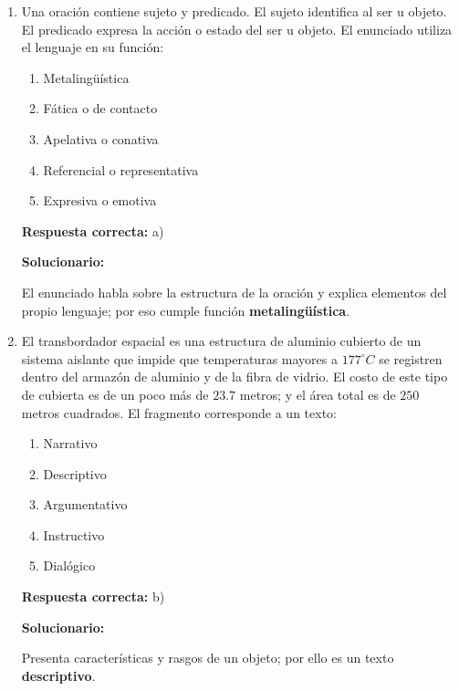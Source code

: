 \begin{enumerate}[resume]
	
	\item Una oración contiene sujeto y predicado. El sujeto identifica al ser u objeto. El predicado expresa la acción o estado del ser u objeto. El enunciado utiliza el lenguaje en su función:
	\begin{enumerate}[label=\alph*)]
		\item Metalingüística
		\item Fática o de contacto
		\item Apelativa o conativa
		\item Referencial o representativa
		\item Expresiva o emotiva
	\end{enumerate}
	\textbf{Respuesta correcta:} a)
	
	\vspace{2mm}
	\textbf{Solucionario:}
	
	El enunciado habla sobre la estructura de la oración y explica elementos del propio lenguaje; por eso cumple función \textbf{metalingüística}.
	
	\vspace{6mm}
	
	\item El transbordador espacial es una estructura de aluminio cubierto de un sistema aislante que impide que temperaturas mayores a $177^\circ C$ se registren dentro del armazón de aluminio y de la fibra de vidrio. El costo de este tipo de cubierta es de un poco más de $23.7$ metros; y el área total es de $250$ metros cuadrados. El fragmento corresponde a un texto:
	\begin{enumerate}[label=\alph*)]
		\item Narrativo
		\item Descriptivo
		\item Argumentativo
		\item Instructivo
		\item Dialógico
	\end{enumerate}
	\textbf{Respuesta correcta:} b)
	
	\vspace{2mm}
	\textbf{Solucionario:}
	
	Presenta características y rasgos de un objeto; por ello es un texto \textbf{descriptivo}.
	
	\vspace{6mm}
	

\end{enumerate}
